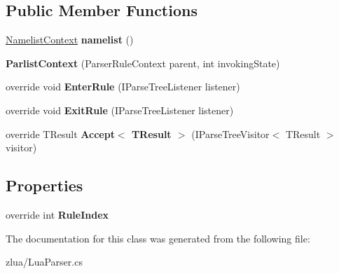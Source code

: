 \subsection*{Public Member Functions}
\begin{DoxyCompactItemize}
\item 
\mbox{\label{classzlua_1_1_lua_parser_1_1_parlist_context_af0668628d3e29502dbfdc7be409dcbd1}} 
\mbox{\hyperlink{classzlua_1_1_lua_parser_1_1_namelist_context}{Namelist\+Context}} {\bfseries namelist} ()
\item 
\mbox{\label{classzlua_1_1_lua_parser_1_1_parlist_context_aca895336cc964a3647fe5f744c75b70c}} 
{\bfseries Parlist\+Context} (Parser\+Rule\+Context parent, int invoking\+State)
\item 
\mbox{\label{classzlua_1_1_lua_parser_1_1_parlist_context_a9d8ab6c94720562843dc563eaffeca2a}} 
override void {\bfseries Enter\+Rule} (I\+Parse\+Tree\+Listener listener)
\item 
\mbox{\label{classzlua_1_1_lua_parser_1_1_parlist_context_a95ff4f650da8960ce670661d802242e6}} 
override void {\bfseries Exit\+Rule} (I\+Parse\+Tree\+Listener listener)
\item 
\mbox{\label{classzlua_1_1_lua_parser_1_1_parlist_context_ac4b057f7fc19254925edc7cdde89ba56}} 
override T\+Result {\bfseries Accept$<$ T\+Result $>$} (I\+Parse\+Tree\+Visitor$<$ T\+Result $>$ visitor)
\end{DoxyCompactItemize}
\subsection*{Properties}
\begin{DoxyCompactItemize}
\item 
\mbox{\label{classzlua_1_1_lua_parser_1_1_parlist_context_a8550d024dfa5d36ca65fc9a5683f8d3d}} 
override int {\bfseries Rule\+Index}
\end{DoxyCompactItemize}


The documentation for this class was generated from the following file\+:\begin{DoxyCompactItemize}
\item 
zlua/Lua\+Parser.\+cs\end{DoxyCompactItemize}

